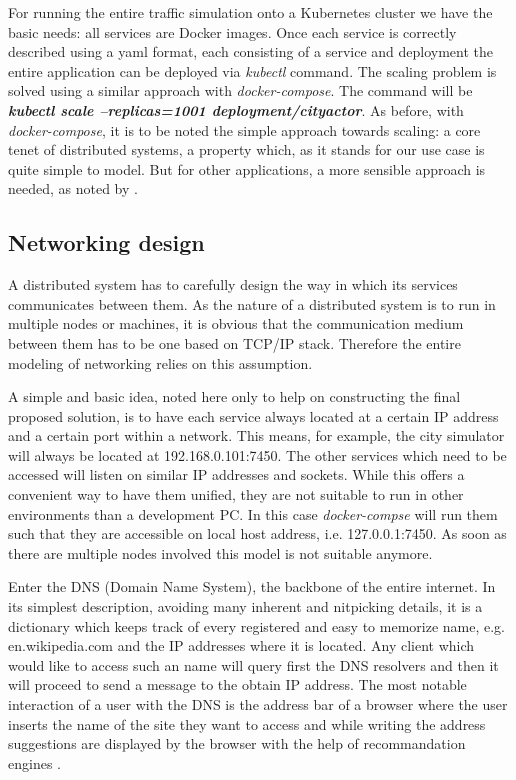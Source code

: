 \documentclass[conference]{IEEEtran}
\begin{document}
For running the entire traffic simulation onto a Kubernetes cluster we have the basic needs: all services are Docker images. Once each service is correctly described using a yaml format, each consisting of a service and deployment the entire application can be deployed via \textit{kubectl} command. The scaling problem is solved using a similar approach with \textit{docker-compose}. The command will be \textit{\textbf{kubectl scale --replicas=1001 deployment/cityactor}}. As before, with \textit{docker-compose}, it is to be noted the simple approach towards scaling: a core tenet of distributed systems, a property which, as it stands for our use case is quite simple to model. But for other applications, a more sensible approach is needed, as noted by \cite{jogalekar2000evaluating}.

\subsection{Networking design}
\label{subsec:networking}

A distributed system has to carefully design the way in which its services communicates between them. As the nature of a distributed system is to run in multiple nodes or machines, it is obvious that the communication medium between them has to be one based on TCP/IP stack. Therefore the entire modeling of networking relies on this assumption.

A simple and basic idea, noted here only to help on constructing the final proposed solution, is to have each service always located at a certain IP address and a certain port within a network. This means, for example, the city simulator will always be located at 192.168.0.101:7450. The other services which need to be accessed will listen on similar IP addresses and sockets. While this offers a convenient way to have them unified, they are not suitable to run in other environments than a development PC. In this case \textit{docker-compse} will run them such that they are accessible on local host address, i.e. 127.0.0.1:7450. As soon as there are multiple nodes involved this model is not suitable anymore.

Enter the DNS (Domain Name System), the backbone of the entire internet. In its simplest description, avoiding many inherent and nitpicking details, it is a dictionary which keeps track of every registered and easy to memorize name, e.g. en.wikipedia.com and the IP addresses where it is located. Any client which would like to access such an name will query first the DNS resolvers and then it will proceed to send a message to the obtain IP address. The most notable interaction of a user with the DNS is the address bar of a browser where the user inserts the name of the site they want to access and while writing the address suggestions are displayed by the browser with the help of recommandation engines \citep{risley2001domain}.
\end{document}
